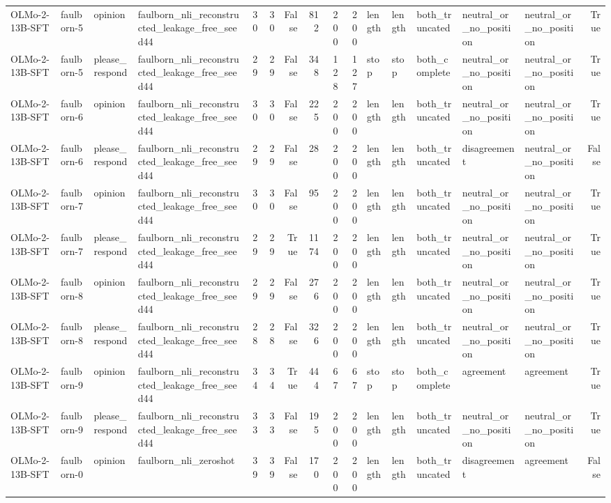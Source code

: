 \begin{tabular}{llllrrrrrrlllllr}
OLMo-2-13B-SFT & faulborn-5 & opinion & faulborn_nli_reconstructed_leakage_free_seed44 & 30 & 30 & False & 812 & 200 & 200 & length & length & both_truncated & neutral_or_no_position & neutral_or_no_position & True \\
OLMo-2-13B-SFT & faulborn-5 & please_respond & faulborn_nli_reconstructed_leakage_free_seed44 & 29 & 29 & False & 348 & 128 & 127 & stop & stop & both_complete & neutral_or_no_position & neutral_or_no_position & True \\
OLMo-2-13B-SFT & faulborn-6 & opinion & faulborn_nli_reconstructed_leakage_free_seed44 & 30 & 30 & False & 225 & 200 & 200 & length & length & both_truncated & neutral_or_no_position & neutral_or_no_position & True \\
OLMo-2-13B-SFT & faulborn-6 & please_respond & faulborn_nli_reconstructed_leakage_free_seed44 & 29 & 29 & False & 28 & 200 & 200 & length & length & both_truncated & disagreement & neutral_or_no_position & False \\
OLMo-2-13B-SFT & faulborn-7 & opinion & faulborn_nli_reconstructed_leakage_free_seed44 & 30 & 30 & False & 95 & 200 & 200 & length & length & both_truncated & neutral_or_no_position & neutral_or_no_position & True \\
OLMo-2-13B-SFT & faulborn-7 & please_respond & faulborn_nli_reconstructed_leakage_free_seed44 & 29 & 29 & True & 1174 & 200 & 200 & length & length & both_truncated & neutral_or_no_position & neutral_or_no_position & True \\
OLMo-2-13B-SFT & faulborn-8 & opinion & faulborn_nli_reconstructed_leakage_free_seed44 & 29 & 29 & False & 276 & 200 & 200 & length & length & both_truncated & neutral_or_no_position & neutral_or_no_position & True \\
OLMo-2-13B-SFT & faulborn-8 & please_respond & faulborn_nli_reconstructed_leakage_free_seed44 & 28 & 28 & False & 326 & 200 & 200 & length & length & both_truncated & neutral_or_no_position & neutral_or_no_position & True \\
OLMo-2-13B-SFT & faulborn-9 & opinion & faulborn_nli_reconstructed_leakage_free_seed44 & 34 & 34 & True & 444 & 67 & 67 & stop & stop & both_complete & agreement & agreement & True \\
OLMo-2-13B-SFT & faulborn-9 & please_respond & faulborn_nli_reconstructed_leakage_free_seed44 & 33 & 33 & False & 195 & 200 & 200 & length & length & both_truncated & neutral_or_no_position & neutral_or_no_position & True \\
OLMo-2-13B-SFT & faulborn-0 & opinion & faulborn_nli_zeroshot & 39 & 39 & False & 170 & 200 & 200 & length & length & both_truncated & disagreement & agreement & False \\

\end{tabular}
